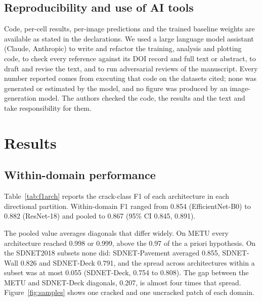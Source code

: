 \documentclass[pdflatex,sn-apa]{sn-jnl}
\begin{document}
\subsection{Reproducibility and use of AI tools}\label{sec:ai}

Code, per-cell results, per-image predictions and the trained baseline weights are available as stated in the declarations. We used a large language model assistant (Claude, Anthropic) to write and refactor the training, analysis and plotting code, to check every reference against its DOI record and full text or abstract, to draft and revise the text, and to run adversarial reviews of the manuscript. Every number reported comes from executing that code on the datasets cited; none was generated or estimated by the model, and no figure was produced by an image-generation model. The authors checked the code, the results and the text and take responsibility for them.

\section{Results}\label{sec:results}


\subsection{Within-domain performance}\label{sec:res-diagonal}

Table~\ref{tab:f1arch} reports the crack-class F1 of each architecture in each directional partition. Within-domain F1 ranged from 0.854 (EfficientNet-B0) to 0.882 (ResNet-18) and pooled to 0.867 (95\% CI 0.845, 0.891).

The pooled value averages diagonals that differ widely. On METU every architecture reached 0.998 or 0.999, above the 0.97 of the a priori hypothesis. On the SDNET2018 subsets none did: SDNET-Pavement averaged 0.855, SDNET-Wall 0.826 and SDNET-Deck 0.791, and the spread across architectures within a subset was at most 0.055 (SDNET-Deck, 0.754 to 0.808). The gap between the METU and SDNET-Deck diagonals, 0.207, is almost four times that spread. Figure~\ref{fig:samples} shows one cracked and one uncracked patch of each domain.
\end{document}
